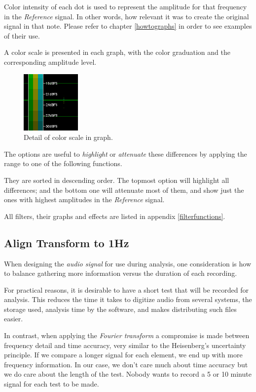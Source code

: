 \documentclass[10pt,a4paper]{report}
\begin{document}
\begin{appendices}
Color intensity of each dot is used to represent the amplitude for that frequency in the \textit{Reference} signal. In other words, how relevant it was to create the original signal in that note. Please refer to chapter \ref{howtographs} in order to see examples of their use.

A color scale is presented in each graph, with the color graduation and the corresponding amplitude level.

\begin{figure}[H]
	\centering
	\includegraphics[width=0.2\linewidth]{images/colorfilter/colorscale.png}
	\caption[Graph color scale]{Detail of color scale in graph.}
	\label{fig:colorscale}
\end{figure}

The options are useful to \textit{highlight} or \textit{attenuate} these differences by applying the range to one of the following functions. 

They are sorted in descending order. The topmost option will highlight all differences; and the bottom one will attenuate most of them, and show just the ones with highest amplitudes in the \textit{Reference} signal.

All filters, their graphs and effects are listed in appendix \ref{filterfunctions}.

\subsection{Align Transform to 1Hz}

When designing the \textit{audio signal} for use during analysis, one consideration is how to balance gathering more information versus the duration of each recording. 

For practical reasons, it is desirable to have a short test that will be recorded for analysis. This reduces the time it takes to digitize audio from several systems, the storage used, analysis time by the software, and makes distributing such files easier.

In contrast, when applying the \textit{Fourier transform} a compromise is made between frequency detail and time accuracy, very similar to the Heisenberg's uncertainty principle. If we compare a longer signal for each element, we end up with more frequency information. In our case, we don't care much about time accuracy but we do care about the length of the test. Nobody wants to record a 5 or 10 minute signal for each test to be made.


\end{appendices}
\end{document}
